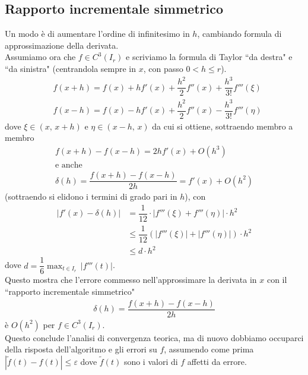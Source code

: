 \subsection{Rapporto incrementale simmetrico}
Un modo è di aumentare l'ordine di infinitesimo in $h$, cambiando formula di approssimazione della derivata.\\
Assumiamo ora che $f\in C^3(I_r)$ e scriviamo la formula di Taylor ``da destra" e ``da sinistra" (centrandola sempre in $x$, con passo $0<h\leq r$).
\[ \begin{split}
	& f(x+h)=f(x)+hf'(x)+\dfrac{h^2}{2}f''(x)+\dfrac{h^3}{3!}f'''(\xi) \\
	& f(x-h)=f(x)-hf'(x)+\dfrac{h^2}{2}f''(x)-\dfrac{h^3}{3!}f'''(\eta)
\end{split} \]
dove $\xi \in (x, \, x+h)$ e $\eta \in (x-h, \, x)$ da cui si ottiene, sottraendo membro a membro
\begin{gather*}
	f(x+h)-f(x-h)=2hf'(x)+O(h^3)\\
	\text{e anche}\\
	\delta (h) = \dfrac{f(x+h)-f(x-h)}{2h} = f'(x) + O(h^2)
\end{gather*} 
(sottraendo si elidono i termini di grado pari in $h$), con
\[ \begin{split}
	|f'(x)-\delta(h)|& =\dfrac{1}{12}\cdot |f'''(\xi)+f'''(\eta)|\cdot h^2 \\
	& \leq \dfrac{1}{12}\left( |f'''(\xi)| + |f'''(\eta)| \right) \cdot h^2 \\
	& \leq d\cdot h^2
\end{split} \]
dove $d=\dfrac{1}{6} \max_{t \in I_r} \, |f'''(t)|$.\\
Questo mostra che l'errore
commesso nell'approssimare la derivata in $x$ con il ``rapporto incrementale simmetrico"
\[ \begin{split}
	\delta (h) = \dfrac{f(x+h)-f(x-h)}{2h}
\end{split} \]
è $O(h^2)$ per $f \in C^3(I_r)$.\\
Questo conclude l'analisi di convergenza teorica, ma di nuovo dobbiamo occuparci della risposta dell'algoritmo e gli errori su $f$, assumendo come prima $|\widetilde{f}(t)-f(t)| \leq \varepsilon$ dove $\widetilde{f}(t)$ sono i valori di $f$ affetti da errore.\\
